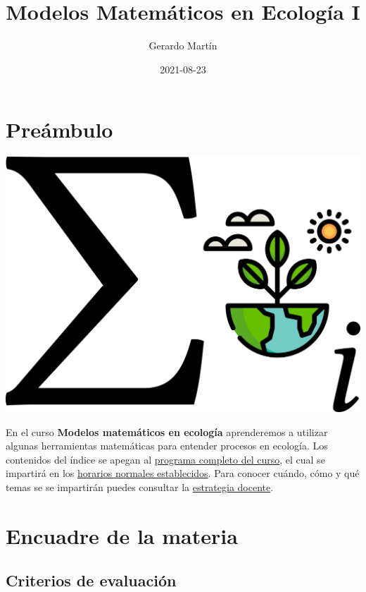 \documentclass[
]{book}
\title{Modelos Matemáticos en Ecología I}
\author{Gerardo Martín}
\date{2021-08-23}
\begin{document}
\maketitle

{
\setcounter{tocdepth}{1}
\tableofcontents
}
\hypertarget{preuxe1mbulo}{%
\chapter{Preámbulo}\label{preuxe1mbulo}}

\begin{center}\includegraphics[width=20.83in]{logo} \end{center}

En el curso \textbf{Modelos matemáticos en ecología} aprenderemos a utilizar algunas herramientas matemáticas para entender procesos en ecología. Los contenidos del índice se apegan al \href{Programa-curso.pdf}{programa completo del curso}, el cual se impartirá en los \href{Horario.pdf}{horarios normales establecidos}. Para conocer cuándo, cómo y qué temas se se impartirán puedes consultar la \href{Estrategia-docente.pdf}{estrategia docente}.

\hypertarget{encuadre-de-la-materia}{%
\chapter{Encuadre de la materia}\label{encuadre-de-la-materia}}

\hypertarget{criterios-de-evaluaciuxf3n}{%
\section{Criterios de evaluación}\label{criterios-de-evaluaciuxf3n}}
\end{document}
